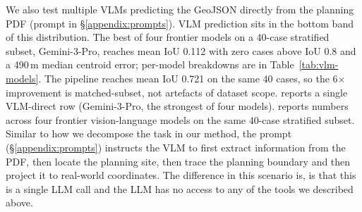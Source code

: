 \documentclass[11pt]{article}
\begin{document}
We also test multiple VLMs predicting the GeoJSON directly from the planning PDF (prompt in \S\ref{appendix:prompts}). VLM prediction sits in the bottom band of this distribution. The best of four frontier models on a 40-case stratified subset, Gemini-3-Pro, reaches mean IoU 0.112 with zero cases above IoU 0.8 and a 490\,m median centroid error; per-model breakdowns are in Table~\ref{tab:vlm-models}. The pipeline reaches mean IoU 0.721 on the same 40 cases, so the 6$\times$ improvement is matched-subset, not artefacts of dataset scope.
 reports a single VLM-direct row (Gemini-3-Pro, the strongest of four models).  reports numbers across four frontier vision-language models on the same 40-case stratified subset. Similar to how we decompose the task in our method, the prompt (\S\ref{appendix:prompts}) instructs the VLM to first extract information from the PDF, then locate the planning site, then trace the planning boundary and then project it to real-world coordinates. The difference in this scenario is, is that this is a single LLM call and the LLM has no access to any of the tools we described above. 
\end{document}
